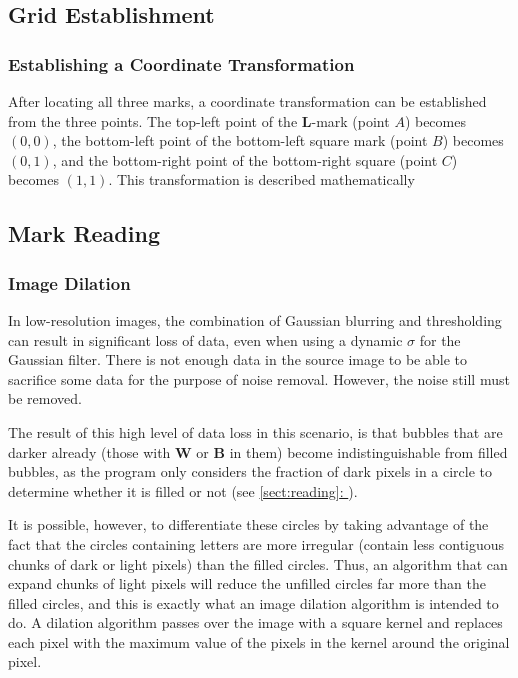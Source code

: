 \documentclass[12pt, letterpaper]{report}
\newcommand*{\sectref}[1]{\hypersetup{linkcolor=usfgreen}\hyperref[{#1}]{\ref*{#1}: \nameref*{#1}}}
\begin{document}
\subsection{Grid Establishment}
\subsubsection{Establishing a Coordinate Transformation}
\label{sect:coordsystem}
After locating all three marks, a coordinate transformation can be established from the
three points. The top-left point of the \textbf{L}-mark (point $A$) becomes $(0,0)$, the bottom-left
point of the bottom-left square mark (point $B$) becomes ${(0,1)}$, and the bottom-right point of the
bottom-right square (point $C$) becomes $(1,1)$. This transformation is described mathematically


\subsection{Mark Reading}

\subsubsection{Image Dilation}
In low-resolution images, the combination of Gaussian blurring and thresholding
can result in significant loss of data, even when using a dynamic $\sigma$ for
the Gaussian filter. There is not enough data in the source image to be able to
sacrifice some data for the purpose of noise removal. However, the noise still
must be removed.

The result of this high level of data loss in this scenario, is that bubbles
that are darker already (those with \textbf{W} or \textbf{B} in them) become
indistinguishable from filled bubbles, as the program only considers the
fraction of dark pixels in a circle to determine whether it is filled or not
(see \sectref{sect:reading}).

It is possible, however, to differentiate these
circles by taking advantage of the fact that the circles containing letters are
more irregular (contain less contiguous chunks of dark or light pixels) than the
filled circles. Thus, an algorithm that can expand chunks of light pixels will
reduce the unfilled circles far more than the filled circles, and this is exactly
what an image dilation algorithm is intended to do. A dilation algorithm passes
over the image with a square kernel and replaces each pixel with the maximum value
of the pixels in the kernel around the original pixel.
\end{document}
